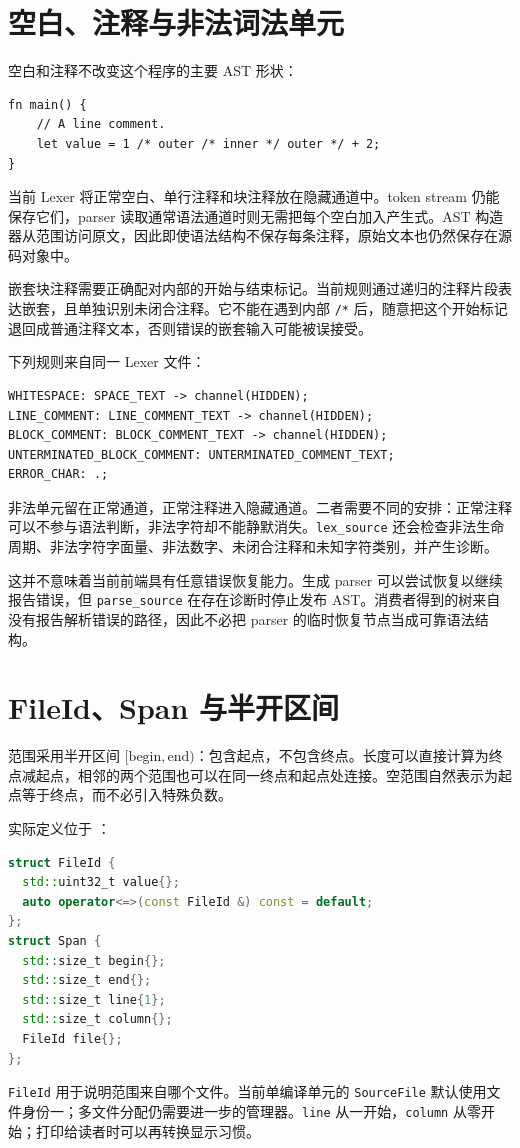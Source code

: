 \section{空白、注释与非法词法单元}
空白和注释不改变这个程序的主要 AST 形状：
\begin{lstlisting}[language=Rustless]
fn main() {
    // A line comment.
    let value = 1 /* outer /* inner */ outer */ + 2;
}
\end{lstlisting}
当前 Lexer 将正常空白、单行注释和块注释放在隐藏通道中。token stream 仍能保存它们，parser 读取通常语法通道时则无需把每个空白加入产生式。AST 构造器从范围访问原文，因此即使语法结构不保存每条注释，原始文本也仍然保存在源码对象中。

嵌套块注释需要正确配对内部的开始与结束标记。当前规则通过递归的注释片段表达嵌套，且单独识别未闭合注释。它不能在遇到内部 \texttt{/*} 后，随意把这个开始标记退回成普通注释文本，否则错误的嵌套输入可能被误接受。

下列规则来自同一 Lexer 文件：
\begin{lstlisting}
WHITESPACE: SPACE_TEXT -> channel(HIDDEN);
LINE_COMMENT: LINE_COMMENT_TEXT -> channel(HIDDEN);
BLOCK_COMMENT: BLOCK_COMMENT_TEXT -> channel(HIDDEN);
UNTERMINATED_BLOCK_COMMENT: UNTERMINATED_COMMENT_TEXT;
ERROR_CHAR: .;
\end{lstlisting}
非法单元留在正常通道，正常注释进入隐藏通道。二者需要不同的安排：正常注释可以不参与语法判断，非法字符却不能静默消失。\texttt{lex\_source} 还会检查非法生命周期、非法字符字面量、非法数字、未闭合注释和未知字符类别，并产生诊断。

这并不意味着当前前端具有任意错误恢复能力。生成 parser 可以尝试恢复以继续报告错误，但 \texttt{parse\_source} 在存在诊断时停止发布 AST。消费者得到的树来自没有报告解析错误的路径，因此不必把 parser 的临时恢复节点当成可靠语法结构。

\section{FileId、Span 与半开区间}
范围采用半开区间 $[\mathrm{begin},\mathrm{end})$：包含起点，不包含终点。长度可以直接计算为终点减起点，相邻的两个范围也可以在同一终点和起点处连接。空范围自然表示为起点等于终点，而不必引入特殊负数。

实际定义位于 ：
\begin{lstlisting}[language=C++]
struct FileId {
  std::uint32_t value{};
  auto operator<=>(const FileId &) const = default;
};
struct Span {
  std::size_t begin{};
  std::size_t end{};
  std::size_t line{1};
  std::size_t column{};
  FileId file{};
};
\end{lstlisting}
\texttt{FileId} 用于说明范围来自哪个文件。当前单编译单元的 \texttt{SourceFile} 默认使用文件身份一；多文件分配仍需要进一步的管理器。\texttt{line} 从一开始，\texttt{column} 从零开始；打印给读者时可以再转换显示习惯。

